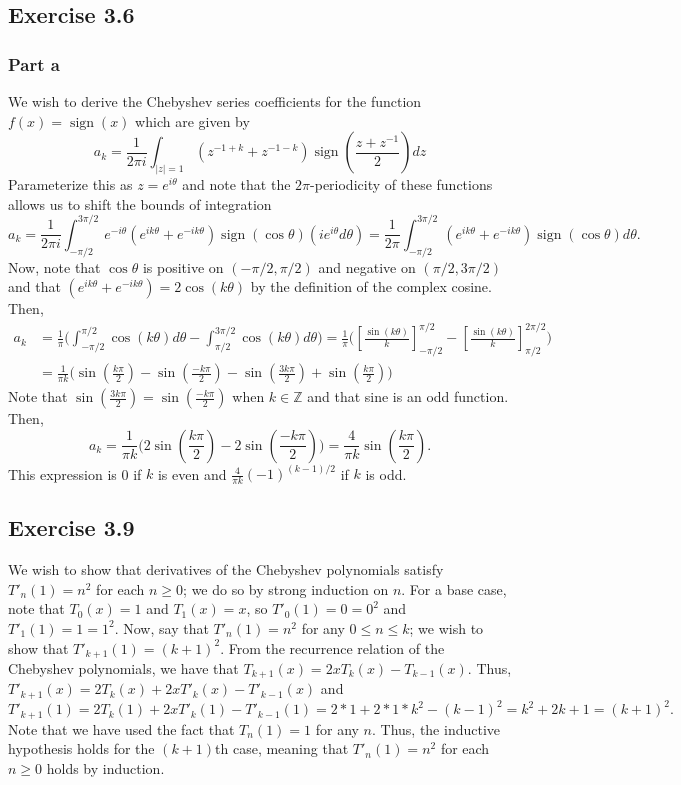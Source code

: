 \documentclass{article}
\DeclareMathOperator\sign{sign}
\begin{document}
\subsection{Exercise 3.6}
\subsubsection{Part a}
We wish to derive the Chebyshev series coefficients for the function $f(x)=\sign(x)$ which are given by
\[
a_k=\frac{1}{2\pi i}\int_{|z|=1}(z^{-1+k}+z^{-1-k})\sign(\frac{z+z^{-1}}{2})dz
\]
Parameterize this as $z=e^{i\theta}$ and note that the $2\pi$-periodicity of these functions allows us to shift the bounds of integration
\[
a_k=\frac{1}{2\pi i}\int_{-\pi/2}^{3\pi/2}e^{-i\theta}(e^{ik\theta}+e^{-ik\theta})\sign(\cos\theta)(ie^{i\theta}d\theta)=\frac{1}{2\pi}\int_{-\pi/2}^{3\pi/2}(e^{ik\theta}+e^{-ik\theta})\sign(\cos\theta)d\theta.
\]
Now, note that $\cos\theta$ is positive on $(-\pi/2,\pi/2)$ and negative on $(\pi/2,3\pi/2)$ and that $(e^{ik\theta}+e^{-ik\theta})=2\cos(k\theta)$ by the definition of the complex cosine. Then,
\[
\begin{split}
a_k&=\frac{1}{\pi}\bigg(\int_{-\pi/2}^{\pi/2}\cos(k\theta)d\theta-\int_{\pi/2}^{3\pi/2}\cos(k\theta)d\theta\bigg)=\frac{1}{\pi}\bigg(\left[\frac{\sin(k\theta)}{k}\right]_{-\pi/2}^{\pi/2}-\left[\frac{\sin(k\theta)}{k}\right]_{\pi/2}^{2\pi/2}\bigg)\\&=
\frac{1}{\pi k}\bigg(\sin(\frac{k\pi}{2})-\sin(\frac{-k\pi}{2})-\sin(\frac{3k\pi}{2})+\sin(\frac{k\pi}{2})\bigg)
\end{split}
\]
Note that $\sin(\frac{3k\pi}{2})=\sin(\frac{-k\pi}{2})$ when $k\in\mathbb{Z}$ and that sine is an odd function. Then, 
\[
a_k=\frac{1}{\pi k}\bigg(2\sin(\frac{k\pi}{2})-2\sin(\frac{-k\pi}{2})\bigg)=\frac{4}{\pi k}\sin(\frac{k\pi}{2}).
\]
This expression is 0 if $k$ is even and $\frac{4}{\pi k}(-1)^{(k-1)/2}$ if $k$ is odd.
\subsection{Exercise 3.9}
We wish to show that derivatives of the Chebyshev polynomials satisfy $T'_n(1)=n^2$ for each $n\geq0$; we do so by strong induction on $n$. For a base case, note that $T_0(x)=1$ and $T_1(x)=x$, so $T'_0(1)=0=0^2$ and $T'_1(1)=1=1^2$. Now, say that $T'_n(1)=n^2$ for any $0\leq n\leq k$; we wish to show that $T'_{k+1}(1)=(k+1)^2$. From the recurrence relation of the Chebyshev polynomials, we have that $T_{k+1}(x)=2xT_k(x)-T_{k-1}(x)$. Thus,
$T'_{k+1}(x)=2T_k(x)+2xT'_k(x)-T'_{k-1}(x)$ and
\[
T'_{k+1}(1)=2T_k(1)+2xT'_k(1)-T'_{k-1}(1)=2*1+2*1*k^2-(k-1)^2=k^2+2k+1=(k+1)^2.
\]
Note that we have used the fact that $T_n(1)=1$ for any $n$. Thus, the inductive hypothesis holds for the $(k+1)$th case, meaning that $T'_n(1)=n^2$ for each $n\geq0$ holds by induction.
\end{document}
